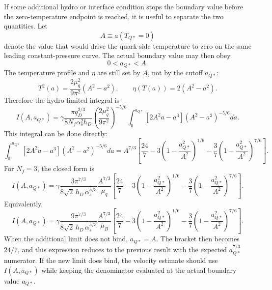 If some additional hydro or interface condition stops the boundary value before
the zero-temperature endpoint is reached, it is useful to separate the two
quantities. Let
\begin{equation}
A\equiv a(T_{Q*}=0)
\end{equation}
denote the value that would drive the quark-side temperature to zero on the
same leading constant-pressure curve. The actual boundary value may then obey
\begin{equation}
0<a_{Q*}<A .
\end{equation}
The temperature profile and \(\eta\) are still set by \(A\), not by the cutoff
\(a_{Q*}\):
\begin{equation}
T^2(a)
=
\frac{2\mu_q^2}{9\pi^2}
\left(A^2-a^2\right),
\qquad
\eta(T(a))=2\left(A^2-a^2\right).
\end{equation}
Therefore the hydro-limited integral is
\begin{equation}
I(A,a_{Q*})
=
\gamma
\frac{\pi q_D^{2/3}}{8N_f\alpha_s^2h_D}
\left(\frac{2\mu_q^2}{9\pi^2}\right)^{-5/6}
\int_0^{a_{Q*}}
\left[
2A^2a-a^3
\right]
\left(A^2-a^2\right)^{-5/6}da .
\end{equation}
This integral can be done directly:
\begin{equation}
\int_0^{a_{Q*}}
\left[
2A^2a-a^3
\right]
\left(A^2-a^2\right)^{-5/6}da
=
A^{7/3}
\left[
\frac{24}{7}
-3\left(1-\frac{a_{Q*}^2}{A^2}\right)^{1/6}
-\frac{3}{7}
\left(1-\frac{a_{Q*}^2}{A^2}\right)^{7/6}
\right].
\end{equation}
For \(N_f=3\), the closed form is
\begin{equation}
I(A,a_{Q*})
=
\gamma
\frac{
3\pi^{7/3}
}{
8\sqrt{2}\,h_D\,\alpha_s^{5/3}
}
\frac{A^{7/3}}{\mu_q}
\left[
\frac{24}{7}
-3\left(1-\frac{a_{Q*}^2}{A^2}\right)^{1/6}
-\frac{3}{7}
\left(1-\frac{a_{Q*}^2}{A^2}\right)^{7/6}
\right].
\end{equation}
Equivalently,
\begin{equation}
I(A,a_{Q*})
=
\gamma
\frac{
9\pi^{7/3}
}{
8\sqrt{2}\,h_D\,\alpha_s^{5/3}
}
\frac{A^{7/3}}{\bar\mu_B}
\left[
\frac{24}{7}
-3\left(1-\frac{a_{Q*}^2}{A^2}\right)^{1/6}
-\frac{3}{7}
\left(1-\frac{a_{Q*}^2}{A^2}\right)^{7/6}
\right].
\end{equation}
When the additional limit does not bind, \(a_{Q*}=A\). The bracket then becomes
\(24/7\), and this expression reduces to the previous result with the expected
\(a_{Q*}^{7/3}\) numerator. If the new limit does bind, the velocity estimate
should use \(I(A,a_{Q*})\) while keeping the denominator evaluated at the
actual boundary value \(a_{Q*}\).

